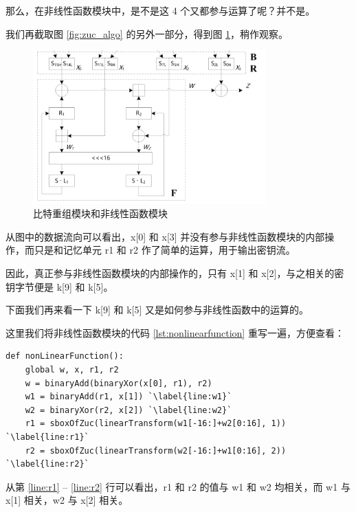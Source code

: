 那么，在非线性函数模块中，是不是这 4 个又都参与运算了呢？并不是。

\vspace*{0.5\baselineskip}

\newpage

我们再截取图 \ref{fig:zuc_algo} 的另外一部分，得到图 \ref{fig:zuc_br_f}，稍作观察。

\begin{figure}[htbp]
    \centering
    \includegraphics[width=0.8\textwidth]{../images/zuc_br_f.png}
    \caption{比特重组模块和非线性函数模块}
    \label{fig:zuc_br_f}
\end{figure}

从图中的数据流向可以看出，{\cnsls x[0]} 和 {\cnsls x[3]} 并没有参与非线性函数模块的内部操作，而只是和记忆单元 {\cnsls r1} 和 {\cnsls r2} 作了简单的运算，用于输出密钥流。

因此，真正参与非线性函数模块的内部操作的，只有 {\cnsls x[1]} 和 {\cnsls x[2]}，与之相关的密钥字节便是 {\cnsls k[9]} 和 {\cnsls k[5]}。

下面我们再来看一下 {\cnsls k[9]} 和 {\cnsls k[5]} 又是如何参与非线性函数中的运算的。

这里我们将非线性函数模块的代码 \ref{lst:nonlinearfunction} 重写一遍，方便查看：

\begin{lstlisting}[style=myPython]
def nonLinearFunction():
    global w, x, r1, r2
    w = binaryAdd(binaryXor(x[0], r1), r2)
    w1 = binaryAdd(r1, x[1]) `\label{line:w1}`
    w2 = binaryXor(r2, x[2]) `\label{line:w2}`
    r1 = sboxOfZuc(linearTransform(w1[-16:]+w2[0:16], 1)) `\label{line:r1}`
    r2 = sboxOfZuc(linearTransform(w2[-16:]+w1[0:16], 2)) `\label{line:r2}`
\end{lstlisting}

从第 \ref{line:r1} -- \ref{line:r2} 行可以看出，{\cnsls r1} 和 {\cnsls r2} 的值与 {\cnsls w1} 和 {\cnsls w2} 均相关，而 {\cnsls w1} 与 {\cnsls x[1]} 相关，{\cnsls w2} 与 {\cnsls x[2]} 相关。


